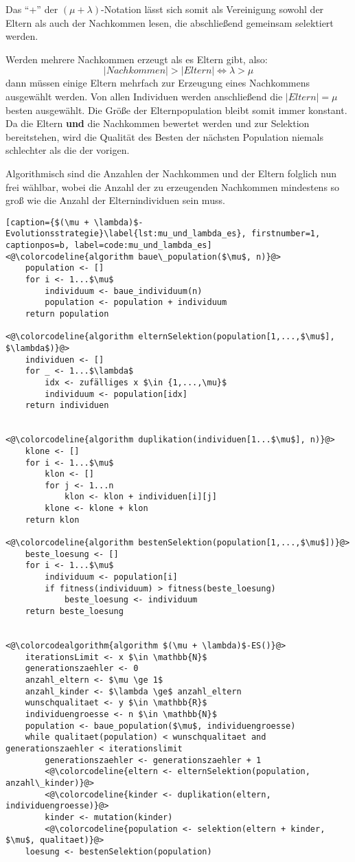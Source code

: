 Das \enquote{+} der $(\mu + \lambda)$-Notation lässt sich somit als Vereinigung sowohl der Eltern als auch der Nachkommen lesen, die abschließend gemeinsam selektiert werden.

Werden mehrere Nachkommen erzeugt als es Eltern gibt, also:
\begin{equation}
|Nachkommen| > |Eltern| \Leftrightarrow \lambda > \mu
\end{equation}
dann müssen einige Eltern mehrfach zur Erzeugung eines Nachkommens ausgewählt werden.
Von allen Individuen werden anschließend die $|Eltern| = \mu$ besten ausgewählt. Die Größe der Elternpopulation bleibt somit immer konstant. Da die Eltern \textbf{und} die Nachkommen bewertet werden und zur Selektion bereitstehen, wird die Qualität des Besten der nächsten Population niemals schlechter als die der vorigen.

Algorithmisch sind die Anzahlen der Nachkommen und der Eltern folglich nun frei wählbar, wobei die Anzahl der zu erzeugenden Nachkommen mindestens so groß wie die Anzahl der Elternindividuen sein muss.

\begin{lstlisting}[caption={$(\mu + \lambda)$-Evolutionsstrategie}\label{lst:mu_und_lambda_es}, firstnumber=1, captionpos=b, label=code:mu_und_lambda_es]
<@\colorcodeline{algorithm baue\_population($\mu$, n)}@>
	population <- []
	for i <- 1...$\mu$
		individuum <- baue_individuum(n)
		population <- population + individuum
	return population
	
<@\colorcodeline{algorithm elternSelektion(population[1,...,$\mu$], $\lambda$)}@>
	individuen <- []
	for _ <- 1...$\lambda$
		idx <- zufälliges x $\in {1,...,\mu}$
		individuum <- population[idx]
	return individuen
	

<@\colorcodeline{algorithm duplikation(individuen[1...$\mu$], n)}@>
	klone <- []
	for i <- 1...$\mu$
		klon <- []
		for j <- 1...n
			klon <- klon + individuen[i][j]
		klone <- klone + klon
	return klon
	
<@\colorcodeline{algorithm bestenSelektion(population[1,...,$\mu$])}@>
	beste_loesung <- []
	for i <- 1...$\mu$
		individuum <- population[i]
		if fitness(individuum) > fitness(beste_loesung)
			beste_loesung <- individuum
	return beste_loesung
	

<@\colorcodealgorithm{algorithm $(\mu + \lambda)$-ES()}@>
	iterationsLimit <- x $\in \mathbb{N}$
	generationszaehler <- 0
	anzahl_eltern <- $\mu \ge 1$
	anzahl_kinder <- $\lambda \ge$ anzahl_eltern
	wunschqualitaet <- y $\in \mathbb{R}$
	individuengroesse <- n $\in \mathbb{N}$
	population <- baue_population($\mu$, individuengroesse)
	while qualitaet(population) < wunschqualitaet and generationszaehler < iterationslimit
		generationszaehler <- generationszaehler + 1
		<@\colorcodeline{eltern <- elternSelektion(population, anzahl\_kinder)}@>
		<@\colorcodeline{kinder <- duplikation(eltern, individuengroesse)}@>
		kinder <- mutation(kinder)
		<@\colorcodeline{population <- selektion(eltern + kinder, $\mu$, qualitaet)}@>
	loesung <- bestenSelektion(population)
\end{lstlisting}

